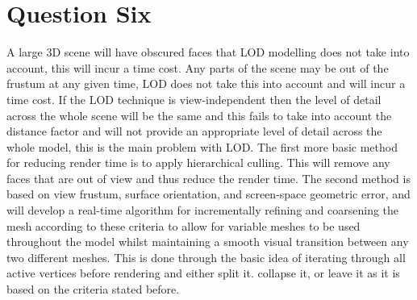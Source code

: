 \documentclass[paper=a4, fontsize=11pt]{scrartcl}
\numberwithin{equation}{section}		%
\numberwithin{figure}{section}			%
\numberwithin{table}{section}				%
\begin{document}
\section*{Question Six}

\iffalse
20 marks \\
200 words \\
Explain the main issue of applying level-of-detail modeling to support interactive visualisation
of a large 3D scene, given that the user is allowed to change the viewpoint from time to time.
Describe two different methods to tackle such a challenge. \\
\fi

A large 3D scene will have obscured faces that LOD modelling does not take into account, this will incur a time cost. Any parts of the scene may be out of the frustum at any given time, LOD does not take this into account and will incur a time cost. If the LOD technique is view-independent then the level of detail across the whole scene will be the same and this fails to take into account the distance factor and will not provide an appropriate level of detail across the whole model, this is the main problem with LOD. The first more basic method for reducing render time is to apply hierarchical culling. This will remove any faces that are out of view and thus reduce the render time. The second method is based on view frustum, surface orientation, and screen-space geometric error, and will develop a real-time algorithm for incrementally refining and coarsening the mesh according to these criteria to allow for variable meshes to be used throughout the model whilst maintaining a smooth visual transition between any two different meshes. This is done through the basic idea of iterating through all active vertices before rendering and either split it. collapse it, or leave it as it is based on the criteria stated before.
\end{document}

